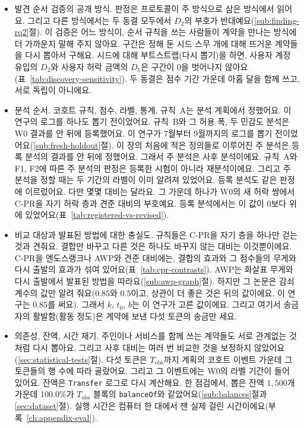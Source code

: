 \begin{itemize}
\item 발견 순서 검증의 공개 방식. 판정은 프로토콜이 주 방식으로 삼은 방식에서 읽어요. 그리고 다른 방식에서는 두 동결 모두에서 $D_2$의 부호가 반대예요(\ref{sub:finding-rq2}절). 이 검증은 어느 방식이, 순서 규칙을 쓰는 사람들이 계약을 만나는 방식에 더 가까운지 말해 주지 않아요. 구간은 정해 둔 시드 스무 개에 대해 뜨거운 계약들을 다시 뽑아서 구해요. 시드에 대해 부트스트랩(다시 뽑기)을 하면, 사용자 계정 유입의 $D_2$와 사용자 허락 금액의 $D_1$은 구간이 0을 벗어나지 않아요(표~\ref{tab:discovery-sensitivity}). 두 동결은 점수 기간 가운데 아홉 달을 함께 쓰고, 서로 독립이 아니에요.
\item 분석 순서. 코호트 규칙, 점수, 라벨, 통계, 규칙~A는 분석 계획에서 정했어요. 이 연구의 로그를 하나도 뽑기 전이었어요. 규칙~B와 그 허용 폭, 두 민감도 분석은 W0 결과를 안 뒤에 등록했어요. 이 연구가 7월부터 9월까지의 로그를 뽑기 전이었어요(\ref{sub:fresh-holdout}절). 이 장의 처음에 적은 정의들로 이루어진 주 분석은 등록 분석의 결과를 안 뒤에 정했어요. 그래서 주 분석은 사후 분석이에요. 규칙~A와 F1, F2에 따른 주 분석의 판정은 등록한 시험이 아니라 재분석이에요. 그리고 주 분석을 정할 때는 두 기간의 라벨이 이미 알려져 있었어요. 등록 분석도 같은 판정에 이르렀어요. 다만 몇몇 대비는 달라요. 그 가운데 하나가 W0의 새 허락 쌍에서 \mbox{C-PR}을 자기 허락 층과 견준 대비의 부호예요. 등록 분석에서는 이 값이 0보다 위에 있었어요(표~\ref{tab:registered-vs-revised}).
\item 비교 대상과 발표된 방법에 대한 충실도. 규칙들은 \mbox{C-PR}을 자기 층을 하나만 걷는 것과 견줘요. 결합만 바꾸고 다른 것은 하나도 바꾸지 않는 대비는 이것뿐이에요. \mbox{C-PR}을 엔도스랭크나 AWP와 견준 대비에는, 결합의 효과와 그 점수들의 무게와 다시 출발의 효과가 섞여 있어요(표~\ref{tab:cpr-contrasts}). AWP는 화살표 무게와 다시 출발에서 발표된 방법을 따라요(\ref{sub:awp-graph}절). 하지만 그 논문은 감쇠 계수의 값만 알려 줘요($0.85$와 $0.5$이고, 상관이 더 좋은 것은 뒤의 값이에요. 이 연구는 $0.85$를 써요). 그래서 $k$, $t_0$, $b$는 이 연구가 고른 값이에요. 그리고 여기서 송금자의 활발함(활동 정도)은 계약에 보낸 다섯 토큰의 송금만 세요.
\item 의존성, 잔액, 시간 재기. 주인이나 서비스를 함께 쓰는 계약들도 서로 관계없는 것처럼 다시 뽑아요. 그리고 사후 대비는 여러 번 비교한 것을 보정하지 않았어요(\ref{sec:statistical-tests}절). 다섯 토큰은 $T_{\mathrm{obs}}$까지 계획의 코호트 이벤트 가운데 그 토큰들의 행 수에 따라 골랐어요. 그리고 그 이벤트에는 W0의 라벨 기간이 들어 있어요. 잔액은 \texttt{Transfer} 로그로 다시 계산해요. 한 점검에서, 뽑은 잔액 $1{,}500$개 가운데 100.0\%가 $T_{\mathrm{obs}}$ 블록의 \texttt{balanceOf}와 같았어요(\ref{sub:balances}절과 \ref{sec:dataset}절). 실행 시간은 컴퓨터 한 대에서 잰 실제 걸린 시간이에요(부록~\ref{ch:appendix-eval}).
\end{itemize}

